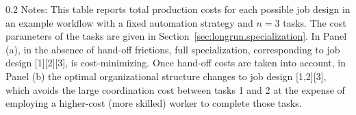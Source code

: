 \begin{table}[!t]
    \caption{Role of Hand-off Costs in Organizational Structure}
    \vspace{-0.3cm}
    \centering
    \label{tab:job_design}
    \footnotesize
    \begin{minipage}{1\linewidth}
\begin{spacing}{0.2}
{\fontsize{9.5pt}{10pt}\selectfont Notes: This table reports total production costs for each possible job design in an example workflow with a fixed automation strategy and $n = 3$ tasks.
The cost parameters of the tasks are given in Section~\ref{sec:longrun.specialization}.
In Panel (a), in the absence of hand-off frictions, full specialization, corresponding to job design [1][2][3], is cost-minimizing.
Once hand-off costs are taken into account, in Panel (b) the optimal organizational structure changes to job design [1,2][3], which avoids the large coordination cost between tasks 1 and 2 at the expense of employing a higher-cost (more skilled) worker to complete those tasks.}
\end{spacing}
\end{minipage}
\end{table}


